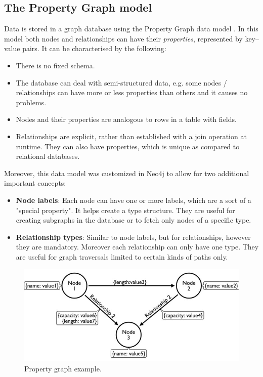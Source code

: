 \documentclass[12pt]{report}
\begin{document}
\subsection{The Property Graph model}

Data is stored in a graph database using the Property Graph data model \cite{learning_neo4j}. In this model both nodes and relationships can have their \textit{properties}, represented by key--value pairs. It can be characterised by the following:
\begin{itemize}
\item There is no fixed schema.
\item The database can deal with semi-structured data, e.g. some nodes / relationships can have more or less properties than others and it causes no problems.
\item Nodes and their properties are analogous to rows in a table with fields.
\item Relationships are explicit, rather than established with a join operation at runtime. They can also have properties, which is unique as compared to relational databases.
\end{itemize}

Moreover, this data model was customized in Neo4j to allow for two additional important concepts:
\begin{itemize}
\item {\bf Node labels}: Each node can have one or more labels, which are a sort of a "special property". It helps create a type structure. They are useful for creating subgraphs in the database or to fetch only nodes of a specific type.
\item {\bf Relationship types}: Similar to node labels, but for relationships, however they are mandatory. Moreover each relationship can only have one type. They are useful for graph traversals limited to certain kinds of paths only.
\end{itemize}

\begin{figure}[!t]
\centering
\includegraphics[width=\textwidth]{property_graph2.jpg} 
\caption[Property graph example.]{Property graph example.\footnotemark{}}
\label{fig.graph_databases}
\end{figure}
\end{document}
